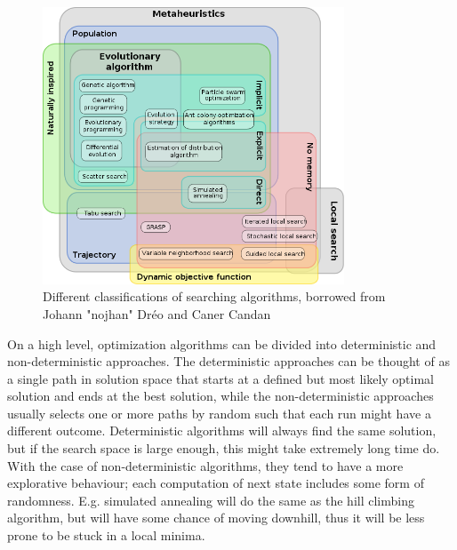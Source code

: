 \begin{figure}
    \centering
    \includegraphics[width=0.8\textwidth]{figs/630px-Metaheuristics_classification.png}
    \caption{Different classifications of searching algorithms, borrowed from Johann "nojhan" Dréo and Caner Candan\cite{wikimetaheuristics}}
    \label{fig:metaheuristics}
\end{figure}

On a high level, optimization algorithms can be divided into deterministic and
non-deterministic approaches. The deterministic approaches can be thought of as
a single path in solution space that starts at a defined but most likely optimal
solution and ends at the best solution, while the non-deterministic approaches
usually selects one or more paths by random such that each run might have a
different outcome. Deterministic algorithms will always find the same solution,
but if the search space is large enough, this might take extremely long time do.
With the case of non-deterministic algorithms, they tend to have a more
explorative behaviour; each computation of next state includes some form of
randomness. E.g. simulated annealing will do the same as the hill climbing
algorithm, but will have some chance of moving downhill, thus it will be less
prone to be stuck in a local minima.


